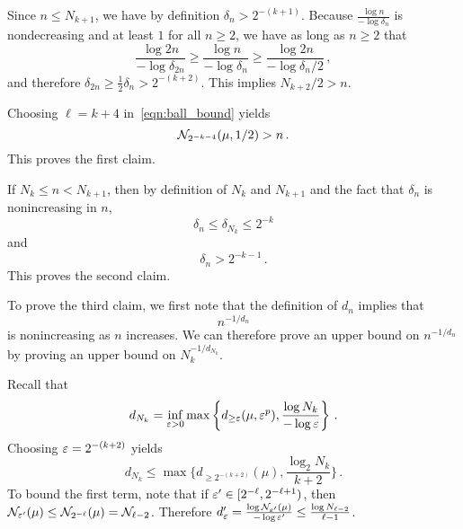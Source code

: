 Since $n \leq N_{k+1}$, we have by definition $\delta_n > 2^{-(k+1)}$.
Because $\frac{\log n}{- \log \delta_n}$ is nondecreasing and at least $1$ for all $n \geq 2$, we have as long as $n \geq 2$ that
\begin{equation*}
\frac{\log 2n}{- \log \delta_{2n}} \geq \frac{\log n}{- \log \delta_n} \geq \frac{\log 2n}{- \log \delta_n/2}\,,
\end{equation*}
and therefore $\delta_{2n} \geq \frac 1 2 \delta_n > 2^{-(k+2)}$.
This implies $N_{k+2}/2 > n$.

Choosing $\ell = k+4$ in~\eqref{eqn:ball_bound} yields
\begin{equation*}
\mathcal{N}_{2^{-k - 4}}(\mu, 1/2) > n\,.
\end{equation*}
This proves the first claim.

If $N_k \leq n < N_{k+1}$, then by definition of $N_k$ and $N_{k+1}$ and the fact that $\delta_n$ is nonincreasing in $n$,
\begin{equation*}
\delta_n \leq \delta_{N_k} \leq 2^{-k}
\end{equation*}
and
\begin{equation*}
\delta_n > 2^{-k-1}\,.
\end{equation*}
This proves the second claim.

To prove the third claim, we first note that the definition of $d_n$ implies that
\begin{equation*}
n^{-1/d_n}
\end{equation*}
is nonincreasing as $n$ increases.
We can therefore prove an upper bound on $n^{-1/d_n}$ by proving an upper bound on $N_k^{-1/d_{N_k}}$.

Recall that
\begin{align*}
d_{N_k} = \inf_{\varepsilon > 0} \max \left\{d_{\geq \varepsilon}(\mu, \varepsilon^p), \frac{\log N_k}{- \log \varepsilon}\right\}\,.
\end{align*}
Choosing $\varepsilon = 2^{-(k+2)}$ yields
\begin{equation*}
d_{N_k} \leq \max \{d_{\geq 2^{-(k+2)}}(\mu), \frac{\log_2 N_k}{k+2}\}\,.
\end{equation*}
To bound the first term, note that if $\varepsilon' \in [2^{-\ell}, 2^{-\ell+1})$, then $\mathcal{N}_{\varepsilon'}(\mu) \leq \mathcal{N}_{2^{-\ell}}(\mu) = \mathcal{N}_{\ell-2}$.
Therefore $d_\varepsilon' = \frac{\log \mathcal{N}_{\varepsilon'}(\mu)}{- \log \varepsilon'} \leq \frac{\log N_{\ell -2}}{\ell - 1}$.

